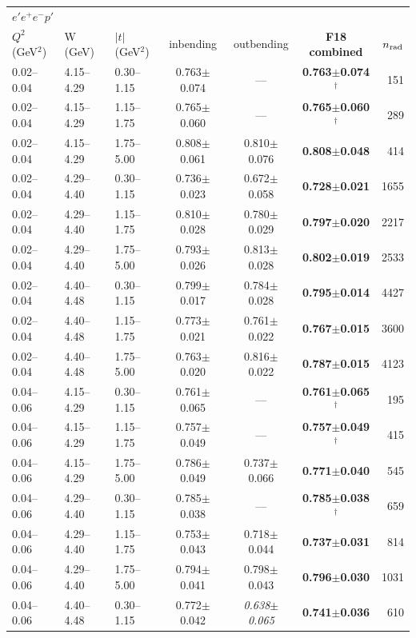 \begin{tabular}{lllcccr}\toprule
\multicolumn{7}{l}{$e'e^+e^-p'$}\\
$Q^2$ (GeV$^2$) & W (GeV) & $|t|$ (GeV$^2$) & inbending & outbending & \textbf{F18 combined} & $n_{\rm rad}$ \\\midrule
0.02--0.04 & 4.15--4.29 & 0.30--1.15 & 0.763$\pm$0.074 & --- & \textbf{0.763$\pm$0.074$^\dagger$} & 151 \\
0.02--0.04 & 4.15--4.29 & 1.15--1.75 & 0.765$\pm$0.060 & --- & \textbf{0.765$\pm$0.060$^\dagger$} & 289 \\
0.02--0.04 & 4.15--4.29 & 1.75--5.00 & 0.808$\pm$0.061 & 0.810$\pm$0.076 & \textbf{0.808$\pm$0.048} & 414 \\
0.02--0.04 & 4.29--4.40 & 0.30--1.15 & 0.736$\pm$0.023 & 0.672$\pm$0.058 & \textbf{0.728$\pm$0.021} & 1655 \\
0.02--0.04 & 4.29--4.40 & 1.15--1.75 & 0.810$\pm$0.028 & 0.780$\pm$0.029 & \textbf{0.797$\pm$0.020} & 2217 \\
0.02--0.04 & 4.29--4.40 & 1.75--5.00 & 0.793$\pm$0.026 & 0.813$\pm$0.028 & \textbf{0.802$\pm$0.019} & 2533 \\
0.02--0.04 & 4.40--4.48 & 0.30--1.15 & 0.799$\pm$0.017 & 0.784$\pm$0.028 & \textbf{0.795$\pm$0.014} & 4427 \\
0.02--0.04 & 4.40--4.48 & 1.15--1.75 & 0.773$\pm$0.021 & 0.761$\pm$0.022 & \textbf{0.767$\pm$0.015} & 3600 \\
0.02--0.04 & 4.40--4.48 & 1.75--5.00 & 0.763$\pm$0.020 & 0.816$\pm$0.022 & \textbf{0.787$\pm$0.015} & 4123 \\
0.04--0.06 & 4.15--4.29 & 0.30--1.15 & 0.761$\pm$0.065 & --- & \textbf{0.761$\pm$0.065$^\dagger$} & 195 \\
0.04--0.06 & 4.15--4.29 & 1.15--1.75 & 0.757$\pm$0.049 & --- & \textbf{0.757$\pm$0.049$^\dagger$} & 415 \\
0.04--0.06 & 4.15--4.29 & 1.75--5.00 & 0.786$\pm$0.049 & 0.737$\pm$0.066 & \textbf{0.771$\pm$0.040} & 545 \\
0.04--0.06 & 4.29--4.40 & 0.30--1.15 & 0.785$\pm$0.038 & --- & \textbf{0.785$\pm$0.038$^\dagger$} & 659 \\
0.04--0.06 & 4.29--4.40 & 1.15--1.75 & 0.753$\pm$0.043 & 0.718$\pm$0.044 & \textbf{0.737$\pm$0.031} & 814 \\
0.04--0.06 & 4.29--4.40 & 1.75--5.00 & 0.794$\pm$0.041 & 0.798$\pm$0.043 & \textbf{0.796$\pm$0.030} & 1031 \\
0.04--0.06 & 4.40--4.48 & 0.30--1.15 & 0.772$\pm$0.042 & \textit{0.638$\pm$0.065} & \textbf{0.741$\pm$0.036} & 610 \\

\end{tabular}
